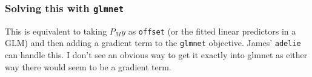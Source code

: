 \documentclass{article}
\begin{document}
          \subsubsection{Solving this with \texttt{glmnet}}

          This is equivalent to taking $P_My$ as \texttt{offset} (or the fitted linear predictors in a GLM) and then adding a
          gradient term to the \texttt{glmnet} objective. James' \texttt{adelie} can handle this. I don't see an obvious way to
          get it exactly into glmnet as either way there would seem to be a gradient term.
\end{document}
